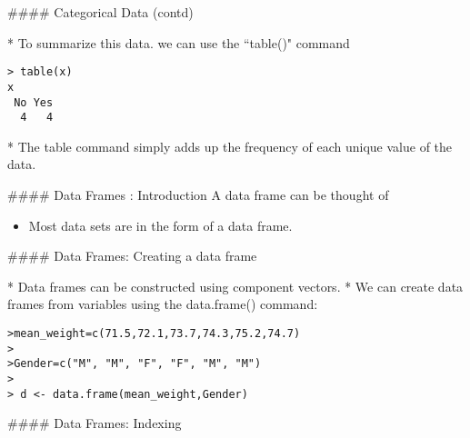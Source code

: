 
#### {Categorical Data (contd)}
\begin{itemize}
* To summarize this data. we can use the ``table()" command

\begin{verbatim}
> table(x)
x
 No Yes
  4   4
\end{verbatim}

* The table command simply adds up the frequency of each unique value of the data.
\end{itemize}






#### {Data Frames : Introduction}
A data frame can be thought of
\begin{itemize}
* as a data matrix or data set * is a generalization of a
matrix * is a data structure of vectors and/or factors of the
same length *  The frame has a unique set of row names. * Data in
the same position across columns come from the same subject. \item
Most data sets are in the form of a data frame.
\end{itemize}



#### {Data Frames: Creating a data frame}
\begin{itemize}
* Data frames can be constructed using component vectors.
* 
We can create data frames from variables using the data.frame()
command:
\begin{verbatim}
>mean_weight=c(71.5,72.1,73.7,74.3,75.2,74.7)
>
>Gender=c("M", "M", "F", "F", "M", "M")
>
> d <- data.frame(mean_weight,Gender)
\end{verbatim}
\end{itemize}




#### {Data Frames: Indexing}

